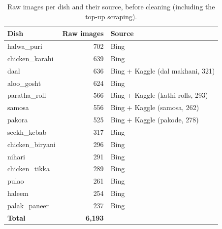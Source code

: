 \begin{table}[H]
  \centering
  \begin{tabular}{|l|r|l|}
    \hline
    \textbf{Dish} & \textbf{Raw images} & \textbf{Source} \\
    \hline
    halwa\_puri     & 702 & Bing \\
    chicken\_karahi & 639 & Bing \\
    daal            & 636 & Bing + Kaggle (dal makhani, 321) \\
    aloo\_gosht     & 624 & Bing \\
    paratha\_roll   & 566 & Bing + Kaggle (kathi rolls, 293) \\
    samosa          & 556 & Bing + Kaggle (samosa, 262) \\
    pakora          & 525 & Bing + Kaggle (pakode, 278) \\
    seekh\_kebab    & 317 & Bing \\
    chicken\_biryani & 296 & Bing \\
    nihari          & 291 & Bing \\
    chicken\_tikka  & 289 & Bing \\
    pulao           & 261 & Bing \\
    haleem          & 254 & Bing \\
    palak\_paneer   & 237 & Bing \\
    \hline
    \textbf{Total}  & \textbf{6,193} & \\
    \hline
  \end{tabular}
  \caption{Raw images per dish and their source, before cleaning (including the top-up scraping).}
\end{table}

